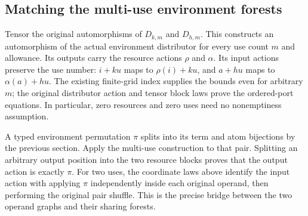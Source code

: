 
\subsection{Matching the multi-use environment forests}

Tensor the original automorphisms of $D_{k,m}$ and $D_{h,m}$. This constructs an
automorphism of the actual environment distributor for every use count $m$ and
allowance. Its outputs carry the resource actions $\rho$ and $\alpha$. Its input
actions preserve the use number: $i+ku$ maps to $\rho(i)+ku$, and $a+hu$ maps to
$\alpha(a)+hu$. The existing finite-grid index supplies the bounds even for
arbitrary $m$; the original distributor action and tensor block laws prove the
ordered-port equations. In particular, zero resources and zero uses need no
nonemptiness assumption.


A typed environment permutation $\pi$ splits into its term and atom
bijections by the previous section. Apply the multi-use construction to that
pair. Splitting an arbitrary output position into the two resource blocks proves
that the output action is exactly $\pi$. For two uses, the coordinate laws above
identify the input action with applying $\pi$ independently inside each original
operand, then performing the original pair shuffle. This is the precise bridge
between the two operand graphs and their sharing forests.


